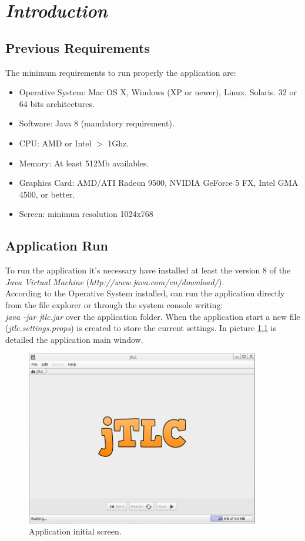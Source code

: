 \chapter{\textit{Introduction}}
\section{Previous Requirements}
The minimum requirements to run properly the application are:
\begin{itemize} \itemsep0pt \parskip0pt 
	\renewcommand{\labelitemi}{$\rightarrow$}
	\item Operative System: Mac OS X, Windows (XP or newer), Linux, Solaris. 32 or 64 bits architectures.
	\item Software: Java 8 (mandatory requirement).
	\item CPU: AMD or Intel {$>$} 1Ghz.
	\item Memory: At least 512Mb availables.
	\item Graphics Card: AMD/ATI Radeon 9500, NVIDIA GeForce 5 FX, Intel GMA 4500, or better.
	\item Screen: minimun resolution 1024x768
\end{itemize}
\newpage

\section{Application Run}
To run the application it's necessary have installed at least the version 8 of the \textit{Java Virtual Machine} (\emph{http://www.java.com/en/download/}).\\
According to the Operative System installed, can run the application directly from the file explorer or through the system console writing:\\ \emph{java -jar jtlc.jar} over the application folder.
When the application start a new file (\textit{jtlc.settings.props}) is created to store the current settings.
In picture \ref{fig:inicial} is detailed  the application main window.

\begin{figure}[H]
	\vspace{0cm}
	\centering
	\includegraphics[width=385px]{imagenes/main}
	\centering
	\vspace{-0.4cm}
	\caption{Application initial screen.}
	\label{fig:inicial}
	\vspace{-0.25cm}
\end{figure}
\newpage

